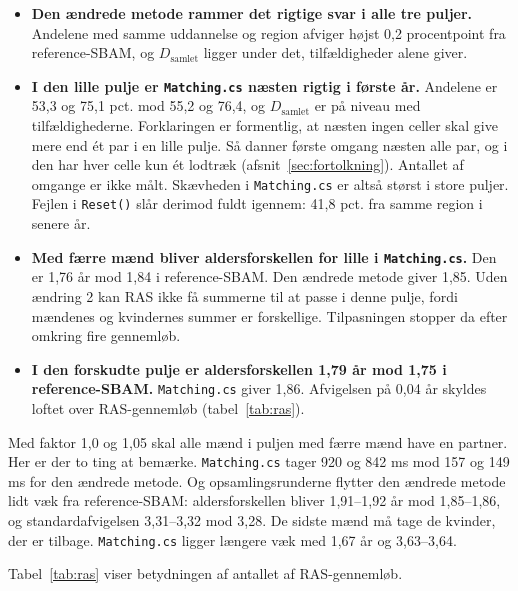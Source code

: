 \documentclass[11pt,a4paper]{article}
\newcommand{\kode}[1]{\texttt{#1}}
\begin{document}
\begin{itemize}
\item \textbf{Den ændrede metode rammer det rigtige svar i alle tre puljer.} Andelene med samme
uddannelse og region afviger højst 0,2 procentpoint fra reference-SBAM, og $D_{\text{samlet}}$
ligger under det, tilfældigheder alene giver.
\item \textbf{I den lille pulje er \kode{Matching.cs} næsten rigtig i første år.} Andelene er 53,3
og 75,1 pct. mod 55,2 og 76,4, og $D_{\text{samlet}}$ er på niveau med tilfældighederne.
Forklaringen er formentlig, at næsten ingen celler skal give mere end ét par i en lille pulje. Så
danner første omgang næsten alle par, og i den har hver celle kun ét lodtræk
(afsnit~\ref{sec:fortolkning}). Antallet af omgange er ikke målt. Skævheden i \kode{Matching.cs} er
altså størst i store puljer. Fejlen i \kode{Reset()} slår derimod fuldt igennem: 41,8 pct. fra samme
region i senere år.
\item \textbf{Med færre mænd bliver aldersforskellen for lille i \kode{Matching.cs}.} Den er 1,76 år
mod 1,84 i reference-SBAM. Den ændrede metode giver 1,85. Uden ændring 2 kan RAS ikke få summerne
til at passe i denne pulje, fordi mændenes og kvindernes summer er forskellige. Tilpasningen
stopper da efter omkring fire gennemløb.
\item \textbf{I den forskudte pulje er aldersforskellen 1,79 år mod 1,75 i reference-SBAM.}
\kode{Matching.cs} giver 1,86. Afvigelsen på 0,04 år skyldes loftet over RAS-gennemløb
(tabel~\ref{tab:ras}).
\end{itemize}

Med faktor 1,0 og 1,05 skal alle mænd i puljen med færre mænd have en partner. Her er der to ting
at bemærke. \kode{Matching.cs} tager 920 og 842 ms mod 157 og 149 ms for den ændrede metode. Og
opsamlingsrunderne flytter den ændrede metode lidt væk fra reference-SBAM: aldersforskellen bliver
1,91--1,92 år mod 1,85--1,86, og standardafvigelsen 3,31--3,32 mod 3,28. De sidste mænd må tage de
kvinder, der er tilbage. \kode{Matching.cs} ligger længere væk med 1,67 år og 3,63--3,64.

Tabel~\ref{tab:ras} viser betydningen af antallet af RAS-gennemløb.
\end{document}
